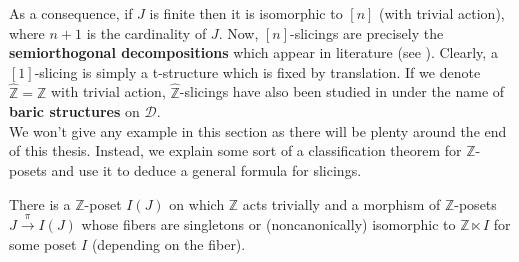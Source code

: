 As a consequence, if $J$ is finite then it is isomorphic to $[n]$ (with trivial action), where $n+1$ is the cardinality of $J$. Now, $[n]$-slicings are precisely the \textbf{semiorthogonal decompositions} which appear in literature (see \cite{kuz}). Clearly, a $[1]$-slicing is simply a t-structure which is fixed by translation. If we denote $\hat{\mathbb{Z}}=\mathbb{Z}$ with trivial action, $\hat{\mathbb{Z}}$-slicings have also been studied in \cite{ach} under the name of \textbf{baric structures} on $\mathscr{D}$. \\
%
%
%
%
%
%

We won't give any example in this section as there will be plenty around the end of this thesis. Instead, we explain some sort of a classification theorem for $\mathbb{Z}$-posets and use it to deduce a general formula for slicings. \\

\begin{prop}\label{ttd}
There is a $\mathbb{Z}$-poset $I(J)$ on which $\mathbb{Z}$ acts trivially and a morphism of $\mathbb{Z}$-posets $J \overset{\pi}{\longrightarrow} I(J)$ whose fibers are singletons or (noncanonically) isomorphic to $\mathbb{Z} \ltimes I$ for some poset $I$ (depending on the fiber). 
\end{prop}

